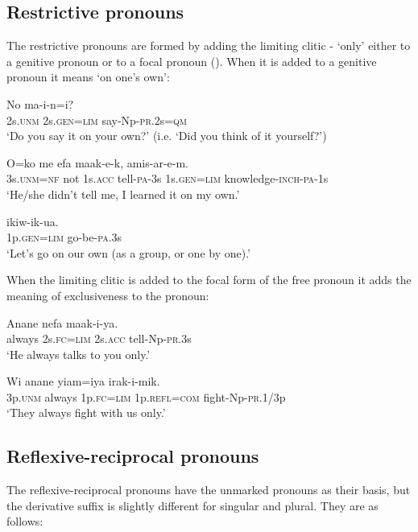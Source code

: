 \subsection{Restrictive pronouns}\label{sec:3:y:x}
{}
The restrictive pronouns are formed by adding the limiting clitic - `only' either to a genitive pronoun or to a focal pronoun (). When it is added to a genitive pronoun it means `on one's own':

\ea%
\label{ex:3:x605}
\gll No  ma-i-n=i? \\
2s.\textsc{unm} 2s.\textsc{gen}=\textsc{lim} say-Np-\textsc{pr}.2s=\textsc{qm}\\
\glt`Do you say it on your own?' (i.e. `Did you think of it yourself?')
\z

\ea%
\label{ex:3:x606}
\gll O=ko me efa maak-e-k,  amis-ar-e-m.\\
3s.\textsc{unm}=\textsc{nf} not 1s.\textsc{acc} tell-\textsc{pa}-3s 1s.\textsc{gen}=\textsc{lim} knowledge-\textsc{inch}-\textsc{pa}-1s\\
\glt`He/she didn't tell me, I learned it on my own.'
\z

\ea%
\label{ex:3:x607}
\gll {} ikiw-ik-ua. \\
1p.\textsc{gen}=\textsc{lim} go-be-\textsc{pa}.3s\\
\glt`Let's go on our own (as a group, or one by one).'
\z

When the limiting clitic is added to the focal form of the free pronoun it adds the meaning of exclusiveness to the pronoun:

\ea%
\label{ex:3:x608}
\gll Anane  nefa maak-i-ya. \\
always 2s.\textsc{fc}=\textsc{lim} 2s.\textsc{acc} tell-Np-\textsc{pr}.3s\\
\glt`He always talks to you only.'
\z

\ea%
\label{ex:3:x609}
\gll Wi anane  yiam=iya irak-i-mik. \\
3p.\textsc{unm} always 1p.\textsc{fc}=\textsc{lim} 1p.\textsc{refl}=\textsc{com} fight-Np-\textsc{pr}.1/3p\\
\glt`They always fight with us only.'
\z

\subsection{Reflexive-reciprocal pronouns}\label{sec:3:y:x}
{}
The reflexive-reciprocal pronouns have the unmarked pronouns as their basis, but the derivative suffix is slightly different for singular and plural. They are as follows:

